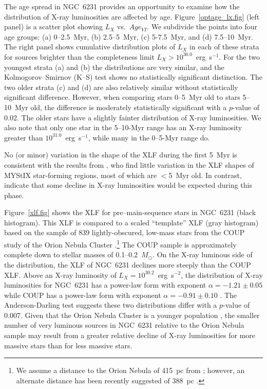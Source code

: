 \documentclass[twocolumn,tighten]{aastex61}
\begin{document}
The age spread in NGC~6231 provides an opportunity to examine how the distribution of X-ray luminosities are affected by age. Figure~\ref{optage_lx.fig} (left panel) is a scatter plot showing $L_X$ vs.\ $Age_{VI}$. We subdivide the points into four age groups: (a) 0--2.5~Myr, (b) 2.5--5~Myr, (c) 5-7.5~Myr, and (d) 7.5--10~Myr. The right panel shows cumulative distribution plots of $L_X$ in each of these strata for sources brighter than the completeness limit $L_X>10^{30.0}$~erg~s$^{-1}$. For the two youngest strata (a) and (b) the distributions are very similar, and the Kolmogorov--Smirnov (K--S) test shows no statistically significant distinction. The two older strata (c) and (d) are also relatively similar without statistically significant difference. However, when comparing stars 0--5~Myr old to stars 5--10~Myr old, the difference is moderately statistically significant with a $p$-value of 0.02. The older stars have a slightly fainter distribution of X-ray luminosities. We also note that only one star in the 5--10-Myr range has an X-ray luminosity greater than $10^{31.0}$~erg~s$^{-1}$, while many in the 0--5-Myr range do. 

No (or minor) variation in the shape of the XLF during the first 5~Myr is consistent with the results from \citet{2015ApJ...802...60K}, who find little variation in the XLF shapes of MYStIX star-forming regions, most of which are $<$5~Myr old. In contrast, \citet{2016MNRAS.457.3836G} indicate that some decline in X-ray luminosities would be expected during this phase.


Figure~\ref{xlf.fig} shows the XLF for pre--main-sequence stars in NGC~6231 (black histogram). This XLF is compared to a scaled ``template'' XLF (gray histogram) based on the sample of 839 lightly-obscured, low-mass stars from the COUP study of the Orion Nebula Cluster \citep{2005ApJS..160..379F}.\footnote{We assume a distance to the Orion Nebula of 415~pc from \citet{2007A&A...474..515M}; however, an alternate distance has been recently suggested of 388~pc \citep{2016arXiv160904041K}.} The COUP sample is approximately complete down to stellar masses of 0.1--0.2~$M_\odot$.  On the X-ray luminous side of the distribution, the XLF of NGC~6231 declines more steeply than the COUP XLF. Above an X-ray luminosity of $L_X =10^{30.2}$~erg~s$^{-2}$, the distribution of X-ray luminosities for NGC~6231 has a power-law form with exponent $\alpha=-1.21\pm0.05$ while COUP has a power-law form with exponent $\alpha=-0.91\pm0.10$ \citep[cf.][]{2015ApJ...802...60K}. The Anderson-Darling test suggests these two distributions differ with a $p$-value of 0.007. Given that the Orion Nebula Cluster is a younger population \citep[mean age $\sim$2.5~Myr;][]{2011MNRAS.418.1948J}, the smaller number of very luminous sources in NGC~6231 relative to the Orion Nebula sample may result from a greater relative decline of X-ray luminosities for more massive stars than for less massive stars.  
\end{document}
